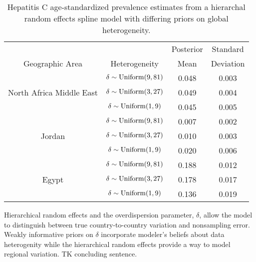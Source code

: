     \begin{table}[h]
        \begin{center}
        \begin{tabular}{|c|c|c|c|}
            \hline
                & & Posterior & Standard \\
                Geographic Area & Heterogeneity & Mean & Deviation \\
            \hline
                & $\delta \sim \operatorname{Uniform}(9,81)$ & 0.048 & 0.003 \\
                North Africa Middle East & $\delta \sim \operatorname{Uniform}(3,27)$ & 0.049 & 0.004 \\
                & $\delta \sim \operatorname{Uniform}(1,9)$ & 0.045 & 0.005 \\
            \hline
                & $\delta \sim \operatorname{Uniform}(9,81)$ & 0.007 & 0.002 \\
                Jordan & $\delta \sim \operatorname{Uniform}(3,27)$ & 0.010 & 0.003 \\
                & $\delta \sim \operatorname{Uniform}(1,9)$ & 0.020 & 0.006 \\
            \hline
                & $\delta \sim \operatorname{Uniform}(9,81)$ & 0.188 & 0.012 \\
                Egypt & $\delta \sim \operatorname{Uniform}(3,27)$ & 0.178 & 0.017 \\
                & $\delta \sim \operatorname{Uniform}(1,9)$ & 0.136 & 0.019 \\
            \hline
        \end{tabular}
        \end{center}
        \caption{ Hepatitis C age-standardized prevalence estimates
          from a hierarchal random effects spline model with differing
          priors on global heterogeneity.}
        \label{tab:app-hepc global rfx}
    \end{table}

Hierarchical random effects and the overdispersion parameter, $\delta$,
allow the model to distinguish between true country-to-country variation
and nonsampling error.  Weakly informative priors on $\delta$ incorporate
modeler's beliefs about data heterogenity while the hierarchical random
effects provide a way to model regional variation.  TK concluding sentence.

